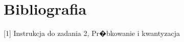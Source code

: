 \documentclass[12pt]{article}
\begin{document}

\section{Bibliografia}
[1] Instrukcja do zadania 2, Pr�bkowanie i kwantyzacja
\end{document}
